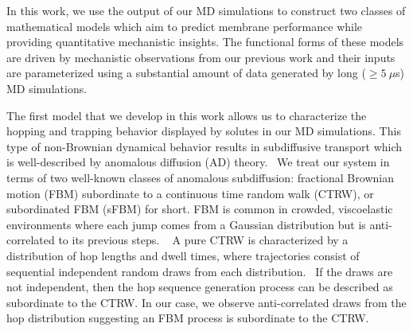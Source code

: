 \documentclass[journal=ancac3,manuscript=article,layout=twocolumn]{achemso}
\begin{document}
  In this work, we use the output of our MD simulations to construct two
  classes of mathematical models which aim to predict membrane performance
  while providing quantitative mechanistic insights. The functional forms of
  these models are driven by mechanistic observations from our previous work and
  their inputs are parameterized using a substantial amount of data generated
  by long ($\geq 5~\mu$s) MD simulations. 
  

  The first model that we develop in this work allows us to characterize the 
  hopping and trapping behavior displayed by solutes in our MD simulations. This 
  type of non-Brownian dynamical behavior results in subdiffusive transport which
  is well-described by anomalous diffusion (AD) theory.~\cite{metzler_random_2000,bouchaud_anomalous_1990,klages_anomalous_2008}
  We treat our system in terms of two well-known classes of anomalous
  subdiffusion: fractional Brownian motion (FBM) subordinate to a 
  continuous time random walk (CTRW), or subordinated FBM (sFBM) for short. 
  FBM is common in crowded, viscoelastic environments where each jump comes 
  from a Gaussian distribution but is anti-correlated to its previous steps.
  ~\cite{mandelbrot_fractional_1968,jeon_fractional_2010,banks_anomalous_2005}
  A pure CTRW is characterized by a distribution of hop lengths and dwell times, 
  where trajectories consist of sequential independent random draws from each
  distribution.~\cite{montroll_random_1965} If the draws are not independent,
  then the hop sequence generation process can be described as subordinate to
  the CTRW. In our case, we observe anti-correlated draws from the hop distribution
  suggesting an FBM process is subordinate to the CTRW.
\end{document}
